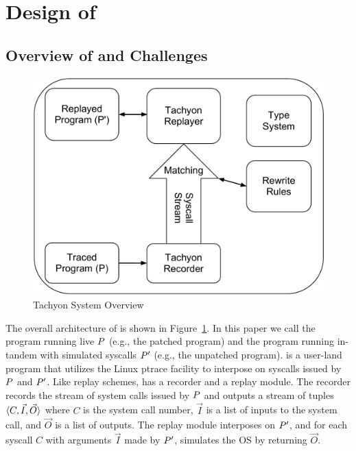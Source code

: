 \section{Design of \tachyon}



\subsection{Overview of \tachyon and Challenges}

\begin{figure}
  \centering
  \includegraphics[scale=0.3]{tachyon/TachyonDiagram.pdf}
  \caption{Tachyon System Overview}
  \label{tach:fig:system}
\end{figure}

The overall architecture of \tachyon is shown in
Figure~\ref{tach:fig:system}.  In this paper we call the program running
live $P$ (e.g., the patched program) and the program running
in-tandem with simulated syscalls $P'$ (e.g., the unpatched
program).  \tachyon is a user-land program that utilizes the Linux
ptrace facility to interpose on syscalls issued by $P$ and
$P'$.  Like replay schemes, \tachyon has a recorder and a
replay module. The recorder records the stream of system calls
issued by $P$ and outputs a stream of tuples
$\langle C, \vec{I}, \vec{O} \rangle$ where $C$ is the system call number,
$\vec{I}$ is a list of inputs to the system call, and $\vec{O}$ is a
list of outputs.  The replay module interposes on $P'$, and
for each syscall $C$ with arguments $\vec{I}$ made by $P'$,
simulates the OS by returning $\vec{O}$.

